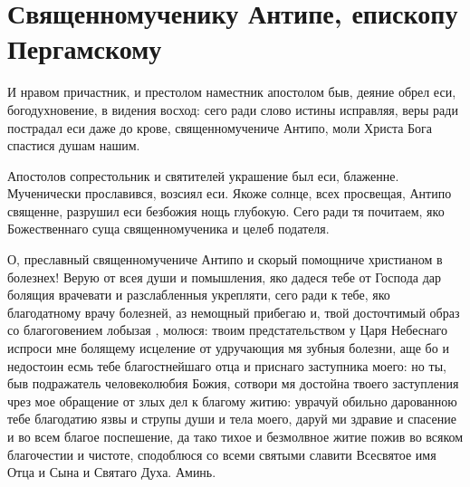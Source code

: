 \section{Священномученику Антипе, епископу Пергамскому}\begin{mymulticols}


И нравом причастник, и престолом наместник апостолом быв, деяние обрел еси, богодухновение, в видения восход: сего ради слово истины исправляя, веры ради пострадал еси даже до крове, священномучениче Антипо, моли Христа Бога спастися душам нашим.


Апостолов сопрестольник и святителей украшение был еси, блаженне. Мученически прославився, возсиял еси. Якоже солнце, всех просвещая, Антипо священне, разрушил еси безбожия нощь глубокую. Сего ради тя почитаем, яко Божественнаго суща священномученика и целеб подателя.


О, преславный священномучениче Антипо и скорый помощниче христианом в болезнех! Верую от всея души и помышления, яко дадеся тебе от Господа дар болящия врачевати и разслабленныя укрепляти, сего ради к тебе, яко благодатному врачу болезней, аз немощный  прибегаю и, твой досточтимый образ со благоговением лобызая , молюся: твоим предстательством у Царя Небеснаго испроси мне болящему  исцеление от удручающия мя зубныя болезни, аще бо и недостоин  есмь тебе благостнейшаго отца и приснаго заступника моего: но ты, быв подражатель человеколюбия Божия, сотвори мя достойна  твоего заступления чрез мое обращение от злых дел к благому житию: уврачуй обильно дарованною тебе благодатию язвы и струпы души и тела моего, даруй ми здравие и спасение и во всем благое поспешение, да тако тихое и безмолвное житие пожив  во всяком благочестии и чистоте, сподоблюся со всеми святыми славити Всесвятое имя Отца и Сына и Святаго Духа. Аминь.

\end{mymulticols}

\mychapterending


